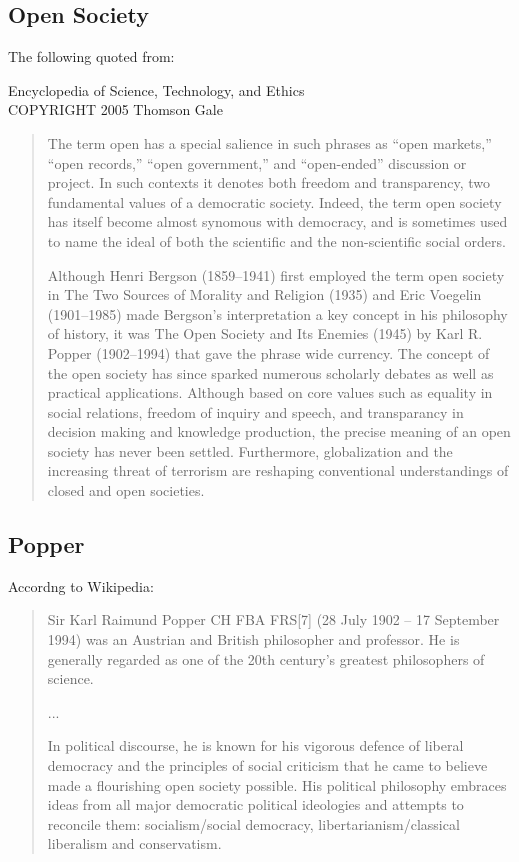 \documentclass[14pt,titlepage]{extarticle}
\begin{document}
\subsection{Open Society}

The following quoted from:

Encyclopedia of Science, Technology, and Ethics \\
COPYRIGHT 2005 Thomson Gale \\

\begin{quote}
The term open has a special salience in such phrases as ``open markets,'' ``open records,'' ``open government,'' and ``open-ended'' discussion or project. In such contexts it denotes both freedom and transparency, two fundamental values of a democratic society. Indeed, the term open society has itself become almost synomous with democracy, and is sometimes used to name the ideal of both the scientific and the non-scientific social orders.

Although Henri Bergson (1859–1941) first employed the term open society in The Two Sources of Morality and Religion (1935) and Eric Voegelin (1901–1985) made Bergson's interpretation a key concept in his philosophy of history, it was The Open Society and Its Enemies (1945) by Karl R. Popper (1902–1994) that gave the phrase wide currency. The concept of the open society has since sparked numerous scholarly debates as well as practical applications. Although based on core values such as equality in social relations, freedom of inquiry and speech, and transparancy in decision making and knowledge production, the precise meaning of an open society has never been settled. Furthermore, globalization and the increasing threat of terrorism are reshaping conventional understandings of closed and open societies.
\end{quote}

\subsection{Popper}

Accordng to Wikipedia:

\begin{quote}
Sir Karl Raimund Popper CH FBA FRS[7] (28 July 1902 – 17 September 1994) was an Austrian and British philosopher and professor.
He is generally regarded as one of the 20th century's greatest philosophers of science.

...

In political discourse, he is known for his vigorous defence of liberal democracy and the principles of social criticism that he came to believe made a flourishing open society possible.
His political philosophy embraces ideas from all major democratic political ideologies and attempts to reconcile them: socialism/social democracy, libertarianism/classical liberalism and conservatism.
\end{quote}
\end{document}
